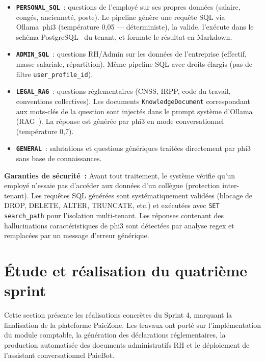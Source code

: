 \begin{itemize}[label=\textbullet, leftmargin=0.6cm]
    \item \textbf{\texttt{PERSONAL\_SQL}}~: questions de l'employé sur
          ses propres données (salaire, congés, ancienneté, poste).
          Le pipeline génère une requête SQL via Ollama~phi3
          (température 0,05 --- déterministe), la valide, l'exécute
          dans le schéma PostgreSQL~\cite{postgresql} du tenant, et formate le résultat
          en Markdown.

    \item \textbf{\texttt{ADMIN\_SQL}}~: questions RH/Admin sur les
          données de l'entreprise (effectif, masse salariale,
          répartition). Même pipeline SQL avec droits élargis
          (pas de filtre \texttt{user\_profile\_id}).

    \item \textbf{\texttt{LEGAL\_RAG}}~: questions réglementaires
          (CNSS, IRPP, code du travail, conventions collectives).
          Les documents \texttt{KnowledgeDocument} correspondant
          aux mots-clés de la question sont injectés dans le prompt
          système d'Ollama (RAG~\cite{rag}). La réponse est générée par phi3
          en mode conversationnel (température 0,7).

    \item \textbf{\texttt{GENERAL}}~: salutations et questions
          génériques traitées directement par phi3~\cite{phi3} sans base de
          connaissances.
\end{itemize}

\textbf{Garanties de sécurité~:} Avant tout traitement, le système
vérifie qu'un employé n'essaie pas d'accéder aux données d'un
collègue (protection inter-tenant). Les requêtes SQL générées
sont systématiquement validées (blocage de DROP, DELETE, ALTER,
TRUNCATE, etc.) et exécutées avec \texttt{SET search\_path} pour
l'isolation multi-tenant. Les réponses contenant des hallucinations
caractéristiques de phi3 sont détectées par analyse regex et
remplacées par un message d'erreur générique.

\section{Étude et réalisation du quatrième sprint}
\label{sec:s4-realisation}

Cette section présente les réalisations concrètes du Sprint 4, marquant
la finalisation de la plateforme PaieZone. Les travaux ont porté sur
l'implémentation du module comptable, la génération des déclarations
réglementaires, la production automatisée des documents administratifs
RH et le déploiement de l'assistant conversationnel PaieBot.

